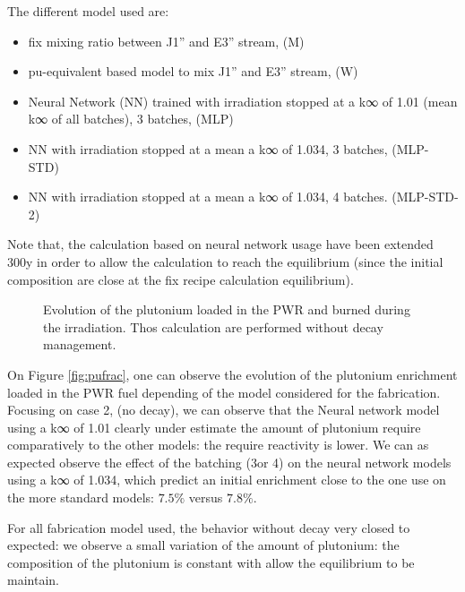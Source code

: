 \documentclass[10pt]{article}
\begin{document}
The different model used are:
\begin{itemize}
  \item fix mixing ratio between J1'' and E3'' stream, (M)
  \item	pu-equivalent based model to mix J1'' and E3'' stream, (W)
  \item	Neural Network (NN) trained with irradiation stopped at a k∞ of 1.01 (mean k∞ of all batches), 3 batches, (MLP)
  \item	NN with irradiation stopped at a mean a k∞ of 1.034, 3 batches, (MLP-STD)
  \item	NN with irradiation stopped at a mean a k∞ of 1.034, 4 batches. (MLP-STD-2)
\end{itemize}

Note that, the calculation based on neural network usage have been extended 300y
in order to allow the calculation to reach the equilibrium (since the initial
composition are close at the fix recipe calculation equilibrium).



\begin{figure}[h!]
    \centering
    \caption{Evolution of the plutonium loaded in the PWR and burned during the
      irradiation. Thos calculation are performed  without decay management.\label{fig:MW_flow} }
\end{figure}


On Figure \ref{fig:pufrac}, one can observe the evolution of the plutonium
enrichment loaded in the PWR fuel depending of the model considered for the
fabrication.
Focusing on case 2, (no decay), we can observe that the Neural network model
using a k∞ of 1.01 clearly under estimate the amount of plutonium require
comparatively to the other models: the require reactivity is lower. We can as
expected observe the effect of the batching (3or 4) on the neural network models
using a k∞ of 1.034, which predict an initial enrichment close to the one
use on the more standard models: $7.5\%$ versus $7.8\%$. 

For all fabrication model used, the behavior without decay very closed to
expected: we observe a small variation of the amount of plutonium: the
composition of the plutonium is constant with allow the equilibrium to be
maintain. 
\end{document}
